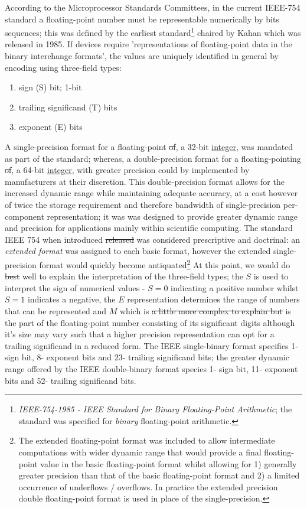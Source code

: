 \documentclass[7pt]{article}
\begin{document}
According to the Microprocessor Standards Committees, in the current IEEE-754 standard a floating-point number must be representable numerically by bits sequences; this was defined by the earliest standard\footnote{\textit{IEEE-754-1985 - IEEE Standard for Binary Floating-Point Arithmetic}; the standard was specified for \textit{binary} floating-point arithmetic.} chaired by Kahan which was released in 1985. If devices require 'representations of floating-point data in the binary interchange formats', the values are uniquely identified in general by encoding using three-field types:
\begin{enumerate}
	\item sign (S) bit; 1-bit
	\item trailing significand (T) bits
	\item exponent (E) bits
\end{enumerate}
A single-precision format for a floating-point \st{of}, a 32-bit \underline{integer}, was mandated as part of the standard; whereas, a double-precision format for a floating-pointing \st{of}, a 64-bit \underline{integer}, with greater precision could by implemented by manufacturers at their discretion. This double-precision format allows for the increased dynamic range while maintaining adequate accuracy, at a cost however of twice the storage requirement and therefore bandwidth of single-precision per-component representation; it was  was designed to provide greater dynamic range and precision for applications mainly within scientific computing. The standard IEEE 754 when introduced \st{released} was considered prescriptive and doctrinal: an \textit{extended format} was assigned to each basic format, however the extended single-precision format would quickly become antiquated\footnote{The extended floating-point format was included to allow intermediate computations with wider dynamic range that would provide a final floating-point value in the basic floating-point format whilst allowing for 1) generally greater precision than that of the basic floating-point format and 2) a limited occurrence of underflows / overflows. In practice the extended precision double floating-point format is used in place of the single-precision.}
At this point, we would do \st{best} well to explain the interpretation of the three-field types;  the $S$ is used to interpret the sign of numerical values - $S=0$ indicating a positive number whilst $S=1$ indicates a negative, the $E$ representation determines the range of numbers that can be represented and $M$ which is \st{a little more complex to explain but} is the part of the floating-point number consisting of its significant digits although it's size may vary such that a higher precision representation can opt for a trailing significand in a reduced form.  The IEEE single-binary format specifies 1- sign bit, 8- exponent bits and 23- trailing significand bits; the greater dynamic range offered by the IEEE double-binary format species 1- sign bit, 11- exponent bits and 52- trailing significand bits.
\end{document}
